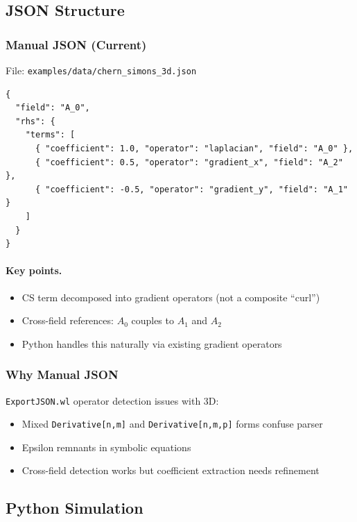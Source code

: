 \subsection{JSON Structure}
\label{sec:cs-json}

\subsubsection{Manual JSON (Current)}
\label{sec:cs-json-current}

File: \texttt{examples/data/chern\_simons\_3d.json}

\begin{lstlisting}[style=json]
{
  "field": "A_0",
  "rhs": {
    "terms": [
      { "coefficient": 1.0, "operator": "laplacian", "field": "A_0" },
      { "coefficient": 0.5, "operator": "gradient_x", "field": "A_2" },
      { "coefficient": -0.5, "operator": "gradient_y", "field": "A_1" }
    ]
  }
}
\end{lstlisting}

\paragraph{Key points.}
\label{par:cs-json-key-points}
\begin{itemize}
  \item CS term decomposed into gradient operators (not a composite ``curl'')
  \item Cross-field references: $A_0$ couples to $A_1$ and $A_2$
  \item Python handles this naturally via existing gradient operators
\end{itemize}

\subsubsection{Why Manual JSON}
\label{sec:cs-why-manual}

\texttt{ExportJSON.wl} operator detection issues with 3D:

\begin{itemize}
  \item Mixed \texttt{Derivative[n,m]} and \texttt{Derivative[n,m,p]} forms confuse parser
  \item Epsilon remnants in symbolic equations
  \item Cross-field detection works but coefficient extraction needs refinement
\end{itemize}

\subsection{Python Simulation}
\label{sec:cs-python}

